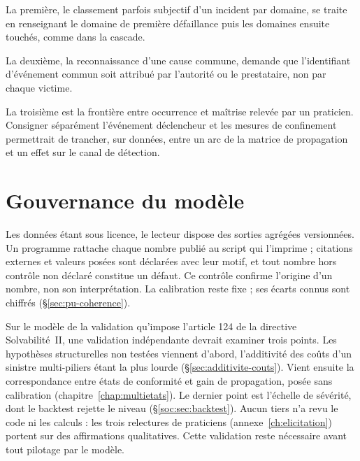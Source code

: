 La première, le classement parfois subjectif d'un incident par domaine, se traite en renseignant le domaine de première défaillance puis les domaines ensuite touchés, comme dans la cascade.

La deuxième, la reconnaissance d'une cause commune, demande que l'identifiant d'événement commun soit attribué par l'autorité ou le prestataire, non par chaque victime.

La troisième est la frontière entre occurrence et maîtrise relevée par un praticien. Consigner
séparément l'événement déclencheur et les mesures de confinement permettrait de trancher, sur données,
entre un arc de la matrice de propagation et un effet sur le canal de détection.

\section{Gouvernance du modèle}
\label{sec:gouvernance-modele}

Les données étant sous licence, le lecteur dispose des sorties agrégées versionnées. Un programme
rattache chaque nombre publié au script qui l'imprime ; citations externes et valeurs posées sont
déclarées avec leur motif, et tout nombre hors contrôle non déclaré constitue un défaut. Ce contrôle
confirme l'origine d'un nombre, non son interprétation. La calibration reste fixe ; ses écarts connus sont
chiffrés (\S\ref{sec:pu-coherence}).

Sur le modèle de la validation qu'impose l'article 124 de la directive Solvabilité~II, une
validation indépendante devrait examiner trois points. Les hypothèses structurelles non testées
viennent d'abord, l'additivité des coûts d'un sinistre multi-piliers étant la plus lourde
(\S\ref{sec:additivite-couts}). Vient ensuite la correspondance entre états de conformité et gain de
propagation, posée sans calibration (chapitre~\ref{chap:multietats}). Le dernier point est l'échelle
de sévérité, dont le backtest rejette le niveau (\S\ref{soc:sec:backtest}). Aucun tiers n'a revu
le code ni les calculs : les trois relectures de praticiens (annexe~\ref{ch:elicitation}) portent sur
des affirmations qualitatives. Cette validation reste nécessaire avant tout pilotage par le modèle.

